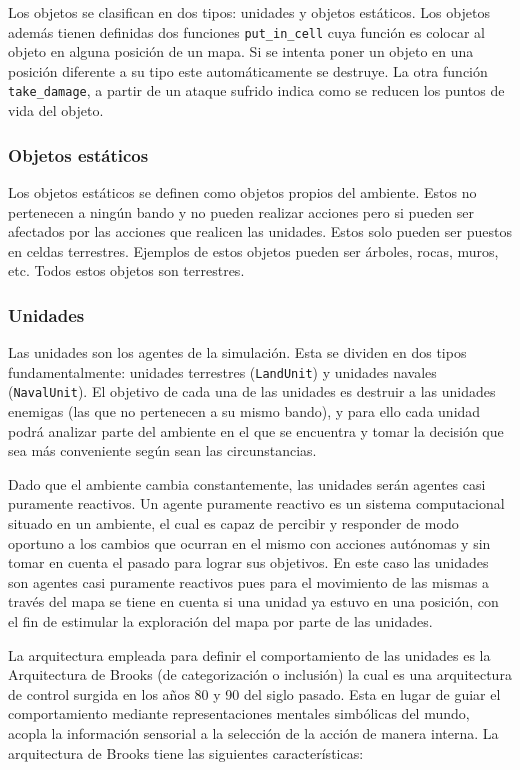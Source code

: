 Los objetos se clasifican en dos tipos: unidades y objetos estáticos. Los objetos además tienen definidas dos funciones \verb|put_in_cell| cuya función es colocar al objeto en alguna posición de un mapa. Si se intenta poner un objeto en una posición diferente a su tipo este automáticamente se destruye. La otra función \verb|take_damage|, a partir de un ataque sufrido indica como se reducen los puntos de vida del objeto.

\subsubsection{Objetos estáticos}

Los objetos estáticos se definen como objetos propios del ambiente. Estos no pertenecen a ningún bando y no pueden realizar acciones pero si pueden ser afectados por las acciones que realicen las unidades. Estos solo pueden ser puestos en celdas terrestres. Ejemplos de estos objetos pueden ser árboles, rocas, muros, etc. Todos estos objetos son terrestres. 

\subsubsection{Unidades}

Las unidades son los agentes de la simulación. Esta se dividen en dos tipos fundamentalmente: unidades terrestres (\verb|LandUnit|) y unidades navales (\verb|NavalUnit|). El objetivo de cada una de las unidades es destruir a las unidades enemigas (las que no pertenecen a su mismo bando), y para ello cada unidad podrá analizar parte del ambiente en el que se encuentra y tomar la decisión que sea más conveniente según sean las circunstancias. 

Dado que el ambiente cambia constantemente, las unidades serán agentes casi puramente reactivos. Un agente puramente reactivo es un sistema computacional situado en un ambiente, el cual es capaz de percibir y responder de modo oportuno a los cambios que ocurran en el mismo con  acciones autónomas y sin tomar en cuenta el pasado para lograr sus objetivos. En este caso las unidades son agentes casi puramente reactivos pues para el movimiento de las mismas a través del mapa se tiene en cuenta si una unidad ya estuvo en una posición, con el fin de estimular la exploración del mapa por parte de las unidades.

La arquitectura empleada para definir el comportamiento de las unidades es la Arquitectura de Brooks (de categorización o inclusión) la cual es una arquitectura de control surgida en los años 80 y 90 del siglo pasado. Esta en lugar de guiar el comportamiento mediante representaciones mentales simbólicas del mundo, acopla la información sensorial  a la selección de la acción de manera interna. La arquitectura de Brooks tiene las siguientes características: 

